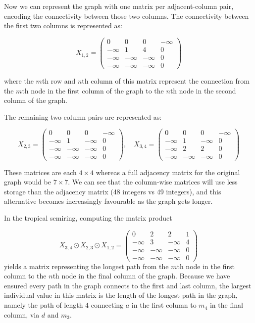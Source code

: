 Now we can represent the graph with one matrix per adjacent-column pair, encoding the connectivity between those two
columns. The connectivity between the first two columns is represented as:

\[
  X_{1,2} = 
  \begin{pmatrix}
  0 & 0 & 0 & -\infty \\
  -\infty & 1 & 4 & 0 \\
  -\infty & -\infty & -\infty & 0 \\
  -\infty & -\infty & -\infty & 0 
  \end{pmatrix}
\]

where the $m$th row and $n$th column of this matrix represent the connection from the $m$th node in the first column of 
the graph to the $n$th node in the second column of the graph.

The remaining two column pairs are represented as:

\[
    X_{2,3} = 
    \begin{pmatrix}
    0 & 0 & 0 & -\infty \\
    -\infty & 1 & -\infty & 0 \\
    -\infty & -\infty & -\infty & 0 \\
    -\infty & -\infty & -\infty & 0 
    \end{pmatrix}, \quad
    X_{3,4} = 
    \begin{pmatrix}
    0 & 0 & 0 & -\infty \\
    -\infty & 1 & -\infty & 0 \\
    -\infty & 2 & 2 & 0 \\
    -\infty & -\infty & -\infty & 0 
    \end{pmatrix}
\]

These matrices are each $4 \times 4$ whereas a full adjacency matrix for the original graph would be $7 \times 7$.
We can see that the column-wise matrices will use less storage than the adjacency matrix (48 integers vs 49 integers),
and this alternative becomes increasingly favourable as the graph gets longer.


In the tropical semiring, computing the matrix product

\[
  X_{3,4} \odot X_{2,3} \odot X_{1,2} = \begin{pmatrix}
  0 & 2 & 2 & 1 \\
  -\infty & 3 & -\infty & 4 \\
  -\infty & -\infty & -\infty & 0 \\
  -\infty & -\infty & -\infty & 0 
\end{pmatrix}
\]
yields a matrix representing the longest path from the $m$th node in the first column to the $n$th node in the final 
column of the graph. Because we have ensured every path in the graph connects to the first and last column, the largest 
individual value in this matrix is the length of the longest path in the graph, namely the path of length 4 connecting 
$a$ in the first column to $m_4$ in the final column, via $d$ and $m_3$.

